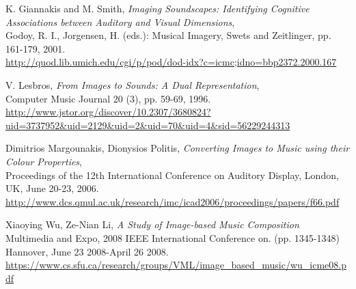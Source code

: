 \begin{thebibliography}{9}
 K. Giannakis and M. Smith,
 \emph{Imaging Soundscapes: Identifying Cognitive Associations between Auditory and Visual Dimensions},\\
 Godoy, R. I., Jorgensen, H. (eds.): Musical Imagery, Swets and Zeitlinger, pp. 161-179, 2001.\\
 \url{http://quod.lib.umich.edu/cgi/p/pod/dod-idx?c=icmc;idno=bbp2372.2000.167}

 V. Lesbros,
 \emph{From Images to Sounds: A Dual Representation},\\
 Computer Music Journal 20 (3), pp. 59-69, 1996.\\
 \url{http://www.jstor.org/discover/10.2307/3680824?uid=3737952&uid=2129&uid=2&uid=70&uid=4&sid=56229244313}

 Dimitrios Margounakis, Dionysios Politis,
 \emph{Converting Images to Music using their Colour Properties},\\ 
 Proceedings of the 12th International Conference on Auditory Display, London, UK, June 20-23, 2006.\\
 \url{http://www.dcs.qmul.ac.uk/research/imc/icad2006/proceedings/papers/f66.pdf}

 Xiaoying Wu, Ze-Nian Li,
 \emph{A Study of Image-based Music Composition}
 Multimedia and Expo, 2008 IEEE International Conference on. (pp. 1345-1348)\\
 Hannover, June 23 2008-April 26 2008.\\
 \url{https://www.cs.sfu.ca/research/groups/VML/image_based_music/wu_icme08.pdf}

\end{thebibliography}